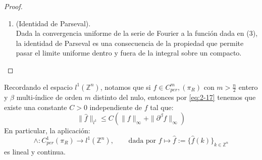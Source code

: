 \begin{proof}
\begin{enumerate}
        \begin{proposition}\label{proposition:2.13}
          Suponga $g\in C^{m}_{per}(\pi_R)$, entonces
          \begin{align*}
            \sum_{k\in\mathbb{Z}^{n}}\hat{g}(k)=g(0).
          \end{align*}
        \end{proposition}
        \begin{proof}
          Se deja como ejercicio al lector.  
        \end{proof}
        Retornando a la convergencia puntual de la serie de Fourier a $f$, consideramos $x_0 \in \pi_R$ arbitrario pero fijo. Definimos la función:
        \begin{align*}
          g(x) = f(x + x_0), \quad x \in \pi_R.            
        \end{align*}
        Se sigue que $g \in C^{m}_{per}(\pi_R)$, $g(0) = f(x_0)$. Además, haciendo un cambio de variable se puede ver que:
        \begin{align*}
          \hat{g}(k) = \begin{cases} 
            \hat{f}(k)e^{ik\cdot x_0}, & \text{si } k \neq 0, \\
            f(0), & \text{si } k = 0.
            \end{cases}
        \end{align*}
        De esta manera, aplicando la Proposición \textcolor{red}{\ref{proposition:2.13}} llegamos a:
        \begin{align*}
          f(x_0)=g(0)=\sum_{k\in\mathbb{Z}^{n}}\hat{g}(k)=\sum_{k\in\mathbb{Z}^{n}}\hat{f}(k)e^{ik\cdot x_0},
        \end{align*}
        es decir, la serie de Fourier converge a la función $f$ en el punto $x_0$. Puesto que este punto es arbitrario y la sserie converge uniformemente, se completa la demostración de $(3)$.
      \item (Identidad de Parseval).\\
        Dada la convergencia uniforme de la serie de Fourier a la función dada en (3), la identidad de Parseval es una consecuencia de la propiedad que permite pasar el limite uniforme dentro y fuera de la integral sobre un compacto.
    \end{enumerate}
    \end{proof}
    \begin{note}
      Recordando el espacio $l^1(\mathbb{Z}^{n})$, notamos que si $f \in C^{m}_{per},(\pi_R)$ con $m>\frac{n}{2}$ entero y $\beta$ multi-índice de orden $m$ distinto del nulo, entonces por \textcolor{red}{\ref{eq:2-17}} tenemos que existe una constante $C > 0$ independiente de $f$ tal que:
      \begin{equation}
        \|\hat{f}\|_{l^1}\leq C(\|f\|_{\infty}+\|\partial^{\beta}f\|_{\infty})  
      \end{equation}
      En particular, la aplicación:
      $$\wedge:C^{1}_{per}(\pi_R)\rightarrow l^1(\mathbb{Z}^{n}),\phantom{xxx}\text{ dada por }f\longmapsto \hat{f}:=\{\hat{f}(k)\}_{k\in\mathbb{Z}^{n}}$$
      es lineal y continua.  
    \end{note}
